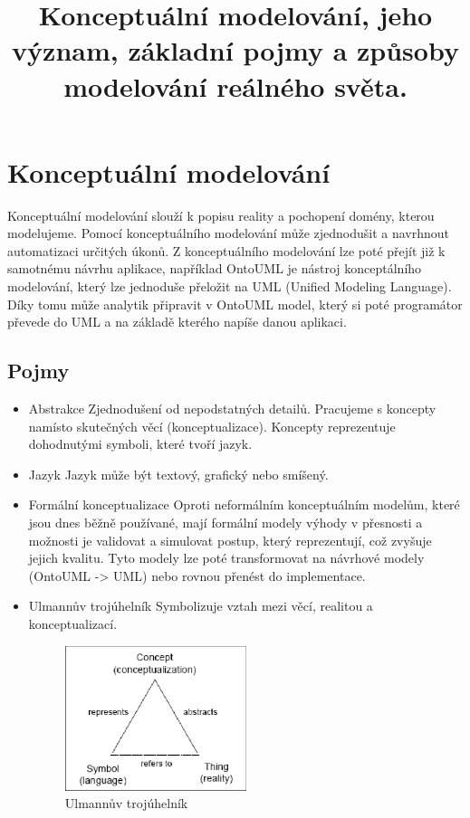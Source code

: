 \documentclass{szzclass}
\title{Konceptuální modelování, jeho význam, základní pojmy a způsoby modelování reálného světa.}
\begin{document}
\maketitle

\tableofcontents
\newpage

\section{Konceptuální modelování}

Konceptuální modelování slouží k popisu reality a pochopení domény, kterou modelujeme.
Pomocí konceptuálního modelování může zjednodušit a navrhnout automatizaci určitých úkonů.
Z konceptuálního modelování lze poté přejít již k samotnému návrhu aplikace, například OntoUML je nástroj konceptálního modelování,
který lze jednoduše přeložit na UML (Unified Modeling Language). Díky tomu může analytik připravit v OntoUML model, který si
poté programátor převede do UML a na základě kterého napíše danou aplikaci.

\subsection{Pojmy}

\begin{itemize}
    \item Abstrakce
          Zjednodušení od nepodstatných detailů. Pracujeme s koncepty namísto skutečných věcí (konceptualizace).
          Koncepty reprezentuje dohodnutými symboli, které tvoří jazyk.
    \item Jazyk
          Jazyk může být textový, grafický nebo smíšený.
    \item Formální konceptualizace
          Oproti neformálním konceptuálním modelům, které jsou dnes běžně používané, mají formální modely
          výhody v přesnosti a možnosti je validovat a simulovat postup, který reprezentují, což zvyšuje jejich kvalitu.
          Tyto modely lze poté transformovat na návrhové modely (OntoUML -> UML) nebo rovnou přenést do implementace.
    \item Ulmannův trojúhelník
          Symbolizuje vztah mezi věcí, realitou a konceptualizací.
          \begin{figure}[ht]
            \centering
            \includegraphics[width=0.5\textwidth]{topics/bi-wsi-si-05/ulmanns_triangle.png}
            \caption{Ulmannův trojúhelník}
          \end{figure}
\end{itemize}
\end{document}
